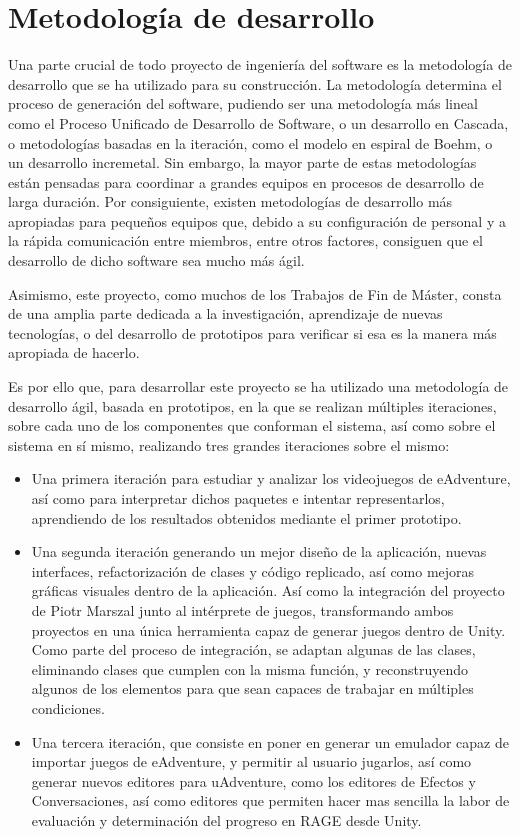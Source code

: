 \section{Metodología de desarrollo}
\label{metodologiadedesarrollo}

Una parte crucial de todo proyecto de ingeniería del software es la metodología de desarrollo que se ha utilizado para su construcción. La metodología determina el proceso de generación del software, pudiendo ser una metodología más lineal como el Proceso Unificado de Desarrollo de Software, o un desarrollo en Cascada, o metodologías basadas en la iteración, como el modelo en espiral de Boehm, o un desarrollo incremetal. Sin embargo, la mayor parte de estas metodologías están pensadas para coordinar a grandes equipos en procesos de desarrollo de larga duración. Por consiguiente, existen metodologías de desarrollo más apropiadas para pequeños equipos que, debido a su configuración de personal y a la rápida comunicación entre miembros, entre otros factores, consiguen que el desarrollo de dicho software sea mucho más ágil.

Asimismo, este proyecto, como muchos de los Trabajos de Fin de Máster, consta de una amplia parte dedicada a la investigación, aprendizaje de nuevas tecnologías, o del desarrollo de prototipos para verificar si esa es la manera más apropiada de hacerlo.

Es por ello que, para desarrollar este proyecto se ha utilizado una metodología de desarrollo ágil, basada en prototipos, en la que se realizan múltiples iteraciones, sobre cada uno de los componentes que conforman el sistema, así como sobre el sistema en sí mismo, realizando tres grandes iteraciones sobre el mismo: 

\begin{itemize}
	\item Una primera iteración para estudiar y analizar los videojuegos de eAdventure, así como para interpretar dichos paquetes e intentar representarlos, aprendiendo de los resultados obtenidos mediante el primer prototipo. 
	
	\item Una segunda iteración generando un mejor diseño de la aplicación, nuevas interfaces, refactorización de clases y código replicado, así como mejoras gráficas visuales dentro de la aplicación. Así como la integración del proyecto de Piotr Marszal junto al intérprete de juegos, transformando ambos proyectos en una única herramienta capaz de generar juegos dentro de Unity. Como parte del proceso de integración, se adaptan algunas de las clases, eliminando clases que cumplen con la misma función, y reconstruyendo algunos de los elementos para que sean capaces de trabajar en múltiples condiciones.
	
	\item Una tercera iteración, que consiste en poner en generar un emulador capaz de importar juegos de eAdventure, y permitir al usuario jugarlos, así como generar nuevos editores para uAdventure, como los editores de Efectos y Conversaciones, así como editores que permiten hacer mas sencilla la labor de evaluación y determinación del progreso en RAGE desde Unity.
\end{itemize}

